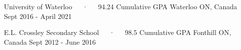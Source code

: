 
\begin{cventries}

  \vspace{0.5mm}

   {University of
    Waterloo~~~·~~~94.24 Cumulative GPA} {Waterloo ON, Canada} {Sept 2016 -
    April 2021}

   {E.L. Crossley
    Secondary School~~~·~~~98.5 Cumulative GPA} {Fonthill ON, Canada} {Sept 2012
    - June 2016}

\end{cventries}
